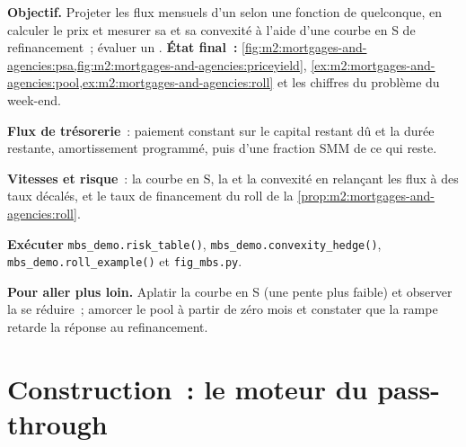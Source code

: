 \begin{tutorial}
\textbf{Objectif.} Projeter les flux mensuels d'un  selon une fonction de
 quelconque, en calculer le prix et mesurer sa  et sa
convexité à l'aide d'une courbe en S de refinancement~; évaluer un . \textbf{État final~:}
\cref{fig:m2:mortgages-and-agencies:psa,fig:m2:mortgages-and-agencies:priceyield},
\cref{ex:m2:mortgages-and-agencies:pool,ex:m2:mortgages-and-agencies:roll} et
les chiffres du problème du week-end.
\begin{tutsteps}
\item \textbf{Flux de trésorerie}~: paiement constant sur le capital restant dû et la durée restante,
amortissement programmé, puis  d'une fraction SMM de ce qui reste.
\label{lst:m2:mortgages-and-agencies:flows}
\item \textbf{Vitesses et risque}~: la courbe en S, la  et la
convexité en relançant les flux à des taux décalés, et le
taux de financement du roll de la \cref{prop:m2:mortgages-and-agencies:roll}.
\label{lst:m2:mortgages-and-agencies:risk}
\item \textbf{Exécuter} \texttt{mbs\_demo.risk\_table()},
\texttt{mbs\_demo.convexity\_hedge()}, \texttt{mbs\_demo.roll\_example()}
et \texttt{fig\_mbs.py}.
\end{tutsteps}
\textbf{Pour aller plus loin.} Aplatir la courbe en S (une pente plus faible) et observer
la  se réduire~; amorcer le pool à partir de zéro mois et constater que la
rampe retarde la réponse au refinancement.
\end{tutorial}

\section{Construction~: le moteur du pass-through}\label{bld:m2:mortgages-and-agencies:prepay}

